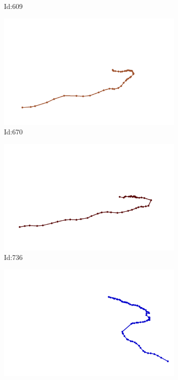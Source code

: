\documentclass[12pt,twoside]{report}
\begin{document}
\begin{figure}
\begin{subfigure}[b]{0.20\textwidth}
\caption{Id:609}
\end{subfigure}
\begin{subfigure}[b]{0.20\textwidth}
\centering
\includegraphics[width=\textwidth]{../trajectories/670.png}
\caption{Id:670}
\end{subfigure}
\begin{subfigure}[b]{0.20\textwidth}
\centering
\includegraphics[width=\textwidth]{../trajectories/736.png}
\caption{Id:736}
\end{subfigure}
\begin{subfigure}[b]{0.20\textwidth}
\centering
\includegraphics[width=\textwidth]{../trajectories/742.png}

\end{subfigure}
\end{figure}
\end{document}
